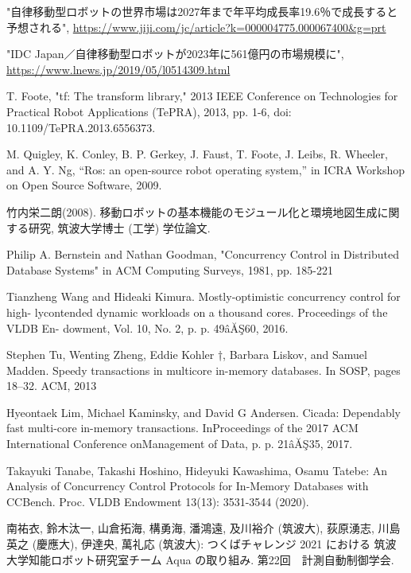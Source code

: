 \documentclass[a4paper]{jreport}	%
\begin{document}
\begin{thebibliography}{99}

 "自律移動型ロボットの世界市場は2027年まで年平均成長率19.6％で成長すると予想される", \url{https://www.jiji.com/jc/article?k=000004775.000067400&g=prt}

 "IDC Japan／自律移動型ロボットが2023年に561億円の市場規模に", \url{https://www.lnews.jp/2019/05/l0514309.html}

 T. Foote, "tf: The transform library," 2013 IEEE Conference on Technologies for Practical Robot Applications (TePRA), 2013, pp. 1-6, doi: 10.1109/TePRA.2013.6556373.

 M. Quigley, K. Conley, B. P. Gerkey, J. Faust, T. Foote, J. Leibs, R. Wheeler, and A. Y. Ng, “Ros: an open-source robot operating system,” in ICRA Workshop on Open Source Software, 2009.

 竹内栄二朗(2008). 移動ロボットの基本機能のモジュール化と環境地図生成に関する研究, 筑波大学博士 (工学) 学位論文.

 Philip A. Bernstein and Nathan Goodman, "Concurrency Control in Distributed Database Systems" in ACM Computing Surveys, 1981, pp. 185-221

 Tianzheng Wang and Hideaki Kimura. Mostly-optimistic concurrency control for high- lycontended dynamic workloads on a thousand cores. Proceedings of the VLDB En- dowment, Vol. 10, No. 2, p. p. 49âĂŞ60, 2016.

 Stephen Tu, Wenting Zheng, Eddie Kohler †, Barbara Liskov,
and Samuel Madden. Speedy transactions in multicore in-memory
databases. In SOSP, pages 18–32. ACM, 2013

 Hyeontaek Lim, Michael Kaminsky, and David G Andersen. Cicada: Dependably fast multi-core in-memory transactions. InProceedings of the 2017 ACM International Conference onManagement of Data, p. p. 21âĂŞ35, 2017.

 Takayuki Tanabe, Takashi Hoshino, Hideyuki Kawashima, Osamu Tatebe: An Analysis of Concurrency Control Protocols for In-Memory Databases with CCBench. Proc. VLDB Endowment 13(13): 3531-3544 (2020).

 南祐衣, 鈴木汰一, 山倉拓海, 構勇海, 潘鴻遠, 及川裕介 (筑波大), 荻原湧志, 川島英之 (慶應大), 伊達央, 萬礼応 (筑波大): つくばチャレンジ 2021 における 筑波大学知能ロボット研究室チーム Aqua の取り組み. 第22回　計測自動制御学会.


\end{thebibliography}
\end{document}
